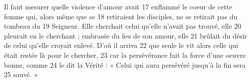 Il faut mesurer quelle violence d'amour avait	 
17	 	enflammé le coeur de cette femme qui, alors même que se	 
18	 	retiraient les disciples, ne se retirait pas du tombeau du	 
19	 	Seigneur. Elle cherchait celui qu'elle n'avait pas trouvé, elle	 
20	 	pleurait en le cherchant ; embrasée du feu de son amour, elle	 
21	 	brûlait du désir de celui qu'elle croyait enlevé. D'où il arriva	 
22	 	que seule le vit alors celle qui était restée là pour le chercher,	 
23	 	car la persévérance fait la force d'une oeuvre bonne, comme	 
24	 	le dit la Vérité : « Celui qui aura persévéré jusqu'à la fin sera	 
25	 	sauvé. »